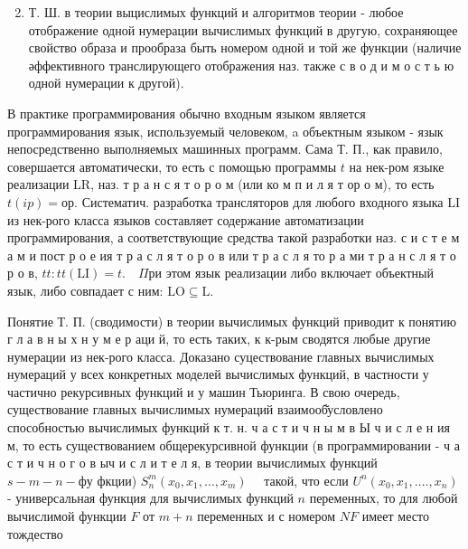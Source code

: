 \documentclass[10pt]{article}
\begin{document}
\begin{enumerate}

  \setcounter{enumi}{1}

  \item Т. Ш. в теории выцислимых функций и алгоритмов теории - любое отображение одной нумерации вычислимых функций в другую, сохраняющее свойство образа и прообраза быть номером одной и той же функции (наличие әффективного транслирующего отображения наз. также с в о д и м о с т ь ю одной нумерации к другой).

\end{enumerate}



В практике программирования обычно входным языком является программирования язык, используемый человеком, a объектным языком - язык непосредственно выполняемых машинных программ. Сама Т. П., как правило, совершается автоматически, то есть с помощью программы $t$ на нек-ром языке реализации $\mathrm{LR}$, наз. т р а н с я т о р о м (или ко м п и л я т ор о м), то есть $t(i p)=о р$. Систематич. разработка трансляторов для любого входного языка LI из нек-рого класса языков составляет содержание автоматизации программирования, а соответствующие средства такой разработки наз. с и с т е м а м и пост р о е ия т р а с л я т о р о в или т р а с л я то р а ми т р а н с л я т о р о в, $t t: t t(\mathrm{LI})=t . \quad \Pi р и$ этом язык реализации либо включает объектный язык, либо совпадает с ним: $\mathrm{LO} \subseteq \mathrm{L}$.



Понятие Т. П. (сводимости) в теории вычислимых функций приводит к понятию г л а в н ы х н у м е р аци й, то есть таких, к к-рым сводятся любые другие нумерации из нек-рого класса. Доказано суцествование главных вычислимых нумераций у всех конкретных моделей вычислимых функций, в частности у частично рекурсивных функций и у машин Тьюринга. В свою очередь, существование главных вычислимых нумераций взаимооб̆условлено способностью вычислимых функций к т. н. ч а с т и ч н ы м в Ы ч и с л е н ия м, то есть существованием общерекурсивной функции (в программировании - ч а с т и ч н о г о в ыч и с л и т е л я, в теории вычислимых функций $s-m-n-ф у$ фкции) $S_{n}^{m}\left(x_{0}, x_{1}, \ldots, x_{m}\right) \quad$ такой, что если $U^{n}\left(x_{0}, x_{1}, \ldots ., x_{n}\right)$ - универсальная функция для вычислимых функций $n$ переменных, то для любой вычислимой функции $F$ от $m+n$ переменных и с номером $N F$ имеет место тождество
\end{document}
